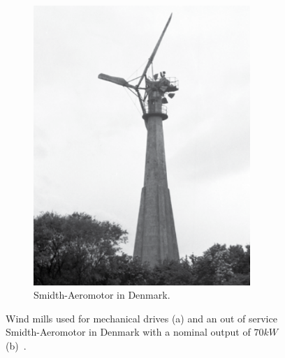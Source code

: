 \begin{figure}[h!]
\begin{subfigure}[b]{0.45\textwidth}
        \includegraphics[trim=0 0 0 0,clip,width=0.9\textwidth]{ch1_introduction/images/Smidth-Aeromotor_fig120hist.png}
        \caption{Smidth-Aeromotor in Denmark.}
    \end{subfigure}
    \caption{Wind mills used for mechanical drives (a) and an out of service Smidth-Aeromotor in Denmark with a nominal output of $70kW$ (b)~\cite{beurskens2014history}.}
    \label{fig:windturbex1}
\end{figure}
